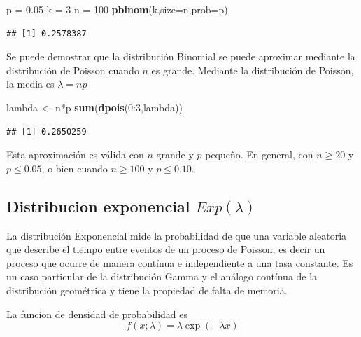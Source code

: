 \documentclass[]{article}
\newenvironment{Shaded}{\begin{snugshade}}{\end{snugshade}}
\newcommand{\KeywordTok}[1]{\textcolor[rgb]{0.13,0.29,0.53}{\textbf{{#1}}}}
\newcommand{\DataTypeTok}[1]{\textcolor[rgb]{0.13,0.29,0.53}{{#1}}}
\newcommand{\DecValTok}[1]{\textcolor[rgb]{0.00,0.00,0.81}{{#1}}}
\newcommand{\FloatTok}[1]{\textcolor[rgb]{0.00,0.00,0.81}{{#1}}}
\newcommand{\StringTok}[1]{\textcolor[rgb]{0.31,0.60,0.02}{{#1}}}
\newcommand{\NormalTok}[1]{{#1}}
\numberwithin{equation}{section}
\begin{document}
\begin{Shaded}
\begin{Highlighting}[]
\NormalTok{p =}\StringTok{ }\FloatTok{0.05}
\NormalTok{k =}\StringTok{ }\DecValTok{3}
\NormalTok{n =}\StringTok{ }\DecValTok{100}
\KeywordTok{pbinom}\NormalTok{(k,}\DataTypeTok{size=}\NormalTok{n,}\DataTypeTok{prob=}\NormalTok{p)}
\end{Highlighting}
\end{Shaded}

\begin{verbatim}
## [1] 0.2578387
\end{verbatim}

Se puede demostrar que la distribución Binomial se puede aproximar
mediante la distribución de Poisson cuando \(n\) es grande. Mediante la
distribución de Poisson, la media es \(\lambda = np\)

\begin{Shaded}
\begin{Highlighting}[]
\NormalTok{lambda <-}\StringTok{ }\NormalTok{n*p}
\KeywordTok{sum}\NormalTok{(}\KeywordTok{dpois}\NormalTok{(}\DecValTok{0}\NormalTok{:}\DecValTok{3}\NormalTok{,lambda))}
\end{Highlighting}
\end{Shaded}

\begin{verbatim}
## [1] 0.2650259
\end{verbatim}

Esta aproximación es válida con \(n\) grande y \(p\) pequeño. En
general, con \(n \geq 20\) y \(p\leq0.05\), o bien cuando \(n\geq 100\)
y \(p\leq 0.10\).

\subsection{\texorpdfstring{Distribucion exponencial
\(Exp(\lambda)\)}{Distribucion exponencial Exp(\textbackslash{}lambda)}}\label{distribucion-exponencial-explambda}

La distribución Exponencial mide la probabilidad de que una variable
aleatoria que describe el tiempo entre eventos de un proceso de Poisson,
es decir un proceso que ocurre de manera contínua e independiente a una
tasa constante. Es un caso particular de la distribución Gamma y el
análogo contínua de la distribución geométrica y tiene la propiedad de
falta de memoria.

La funcion de densidad de probabilidad es \[
f(x;\lambda) =  \lambda \exp(-\lambda x)
\]
\end{document}

